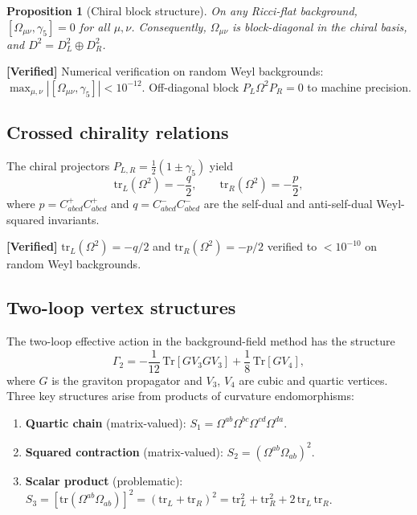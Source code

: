 \documentclass[11pt,a4paper]{article}
\newcommand{\Tr}{\mathrm{Tr}}
\newcommand{\tr}{\mathrm{tr}}
\newtheorem{proposition}[theorem]{Proposition}
\theoremstyle{definition}
\newcommand{\verified}[1]{%
  \par\smallskip\noindent
  \colorbox{green!10}{\parbox{\dimexpr\linewidth-2\fboxsep}{%
    \textcolor{proven}{\textbf{[Verified]}} #1}}%
  \par\smallskip}
\begin{document}
\begin{proposition}[Chiral block structure]\label{prop:chiral-block}
On any Ricci-flat background,
$[\Omega_{\mu\nu}, \gamma_5] = 0$
for all $\mu, \nu$.  Consequently, $\Omega_{\mu\nu}$ is block-diagonal in the
chiral basis, and $D^2 = D^2_L \oplus D^2_R$.
\end{proposition}

\verified{%
  Numerical verification on random Weyl backgrounds:
  $\max_{\mu,\nu} |[\Omega_{\mu\nu}, \gamma_5]| < 10^{-12}$.
  Off-diagonal block $P_L \Omega^2 P_R = 0$ to machine precision.}

\subsection{Crossed chirality relations}

The chiral projectors $P_{L,R} = \tfrac{1}{2}(1 \pm \gamma_5)$ yield
\begin{equation}\label{eq:crossed-chirality}
  \tr_L(\Omega^2) = -\frac{q}{2}, \qquad
  \tr_R(\Omega^2) = -\frac{p}{2},
\end{equation}
where $p = C^+_{abcd} C^+_{abcd}$ and $q = C^-_{abcd} C^-_{abcd}$
are the self-dual and anti-self-dual Weyl-squared invariants.

\verified{%
  $\tr_L(\Omega^2) = -q/2$ and $\tr_R(\Omega^2) = -p/2$ verified to
  $< 10^{-10}$ on random Weyl backgrounds.}

\subsection{Two-loop vertex structures}

The two-loop effective action in the background-field method has the structure
\begin{equation}\label{eq:gamma2}
  \Gamma_2
  = -\frac{1}{12}\,\Tr[G V_3 G V_3]
  + \frac{1}{8}\,\Tr[G V_4],
\end{equation}
where $G$ is the graviton propagator and $V_3$, $V_4$ are cubic and quartic
vertices.  Three key structures arise from products of curvature endomorphisms:

\begin{enumerate}[label=\textbf{S\arabic*}:]
\item \textbf{Quartic chain} (matrix-valued):
  $S_1 = \Omega^{ab}\Omega^{bc}\Omega^{cd}\Omega^{da}$.

\item \textbf{Squared contraction} (matrix-valued):
  $S_2 = (\Omega^{ab}\Omega_{ab})^2$.

\item \textbf{Scalar product} (problematic):
  $S_3 = [\tr(\Omega^{ab}\Omega_{ab})]^2
  = (\tr_L + \tr_R)^2
  = \tr_L^2 + \tr_R^2 + 2\,\tr_L\,\tr_R$.
\end{enumerate}
\end{document}
